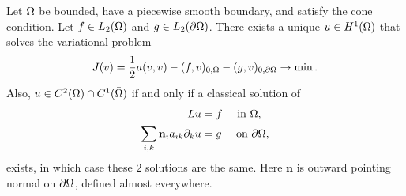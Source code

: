 \begin{thmx}{\quad}
   Let $\Omega$  be bounded, have a piecewise smooth boundary, and satisfy the 
   cone condition. Let $f \in L_2( \Omega)$ and $g\in L_2(\partial \Omega)$.
   There exists a unique $u \in H^1(\Omega)$ that solves the variational problem 
   \begin{equation*}
    J(v) = \frac{1}{2}a(v,v) - (f,v)_{0,\Omega} - (g,v)_{0,\partial\Omega} \to \min.
   \end{equation*}
   Also, $u \in C^2(\Omega)\cap C^1(\bar{\Omega})$ if and only if a classical solution 
   of 
   \begin{align}
    Lu &= f \quad \text{ in }\Omega, \nonumber \\
    \sum_{i,k}  \mathbf{n}_i a_{ik} \partial_k u &= g \quad \text{ on } \partial \Omega, \label{eq:neuman_condition_boundary}
   \end{align}
   exists, in which case these $2$ solutions are the same. Here $\mathbf{n}$ is outward 
   pointing normal on $\partial \Omega$, defined almost everywhere.
   \end{thmx}
